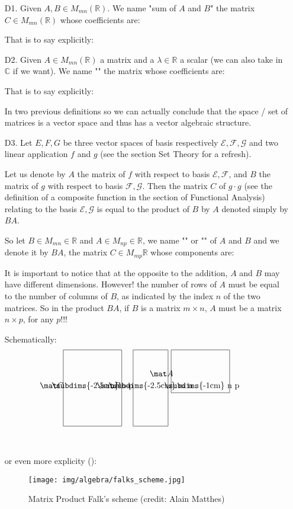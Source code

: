 	\begin{enumerate}
		\item[D1.] Given $A,B\in M_{mn} (\mathbb{R})$. We name "sum of $A$ and $B$" the matrix $C\in M_{mn}(\mathbb{R})$ whose coefficients are:
		
		That is to say explicitly:
		
		
		\item[D2.] Given $A\in M_{mn} (\mathbb{R})$ a matrix and a $\lambda\in \mathbb{R}$ a scalar (we can also take in $\mathbb{C}$ if we want). We name "" the matrix whose coefficients are:
		
		That is to say explicitly:
		
		In two previous definitions so we can actually conclude that the space / set of matrices is a vector space and thus has a vector algebraic structure.
		
		\item[D3.] Let $E, F, G$ be three  vector spaces of basis respectively $\mathcal{E},\mathcal{F},\mathcal{G}$ and two linear application $f$ and $g$ (see the section Set Theory for a refresh).
		
		Let us denote by $A$ the matrix of $f$ with respect to basis $\mathcal{E},\mathcal{F}$, and $B$ the matrix of $g$ with respect to basis $\mathcal{F},\mathcal{G}$. Then the matrix $C$ of $g\cdot g$ (see the definition of a composite function in the section of Functional Analysis) relating to the basis $\mathcal{E},\mathcal{G}$ is equal to the product of $B$ by $A$ denoted simply by $BA$.
		
		So let $B\in M_{mn} \in \mathbb{R}$ and $A\in M_{np} \in \mathbb{R}$, we name "" or "" of $A$ and $B$ and we denote it by $BA$, the matrix $C\in M_{mp}\mathbb{R}$ whose components are:
		
		It is important to notice that at the opposite to the addition, $A$ and $B$ may have different dimensions. However! the number of rows of $A$ must be equal to the number of columns of $B$, as indicated by the index $n$ of the two matrices. So in the product $BA$, if $B$ is a matrix $m\times n$, $A$ must be a matrix $n\times p$, for any $p$!!!
		
		Schematically:
		{\Huge{
		\[
		\framebox[2.5cm]{\clap{\raisebox{0pt}[1.5cm][1.5cm]{$\mat C$}}\subdims{-2.5cm} n p} =
		\framebox[1.5cm]{\clap{\raisebox{0pt}[1.5cm][1.5cm]{$\mat B$}}\subdims{-2.5cm} m n} \ 
		\framebox[2.5cm]{\clap{\raisebox{5mm}[1.5cm]{$\mat A$}}     \subdims{-1cm} n p} 
		\]}}\\\\
		
		or even more explicity ():
		\begin{figure}[H]
		\centering
			\texttt{[image: img/algebra/falks\_scheme.jpg]}
			\caption{Matrix Product Falk's scheme (credit: Alain Matthes)}
		\end{figure}
	\end{enumerate}
